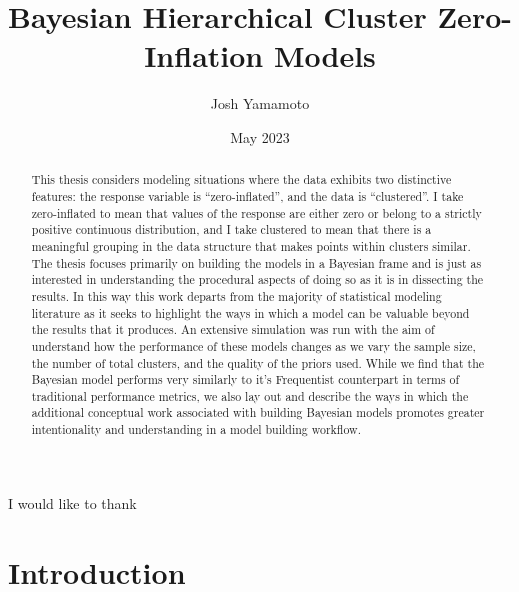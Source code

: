 \documentclass[12pt,twoside]{reedthesis}
\title{Bayesian Hierarchical Cluster Zero-Inflation Models}
\author{Josh Yamamoto}
\date{May 2023}
\begin{document}
  \maketitle

\frontmatter %
\pagestyle{empty} %
  \begin{acknowledgements}
    I would like to thank
  \end{acknowledgements}


  \hypersetup{linkcolor=black}
  \setcounter{secnumdepth}{2}
  \setcounter{tocdepth}{2}
  \tableofcontents

  \listoffigures
  \begin{abstract}
    This thesis considers modeling situations where the data exhibits two distinctive features: the response variable is ``zero-inflated'', and the data is ``clustered''. I take zero-inflated to mean that values of the response are either zero or belong to a strictly positive continuous distribution, and I take clustered to mean that there is a meaningful grouping in the data structure that makes points within clusters similar. The thesis focuses primarily on building the models in a Bayesian frame and is just as interested in understanding the procedural aspects of doing so as it is in dissecting the results. In this way this work departs from the majority of statistical modeling literature as it seeks to highlight the ways in which a model can be valuable beyond the results that it produces. An extensive simulation was run with the aim of understand how the performance of these models changes as we vary the sample size, the number of total clusters, and the quality of the priors used. While we find that the Bayesian model performs very similarly to it's Frequentist counterpart in terms of traditional performance metrics, we also lay out and describe the ways in which the additional conceptual work associated with building Bayesian models promotes greater intentionality and understanding in a model building workflow.
  \end{abstract}

\mainmatter %
\pagestyle{fancyplain} %

\hypertarget{intro-section}{%
\chapter{Introduction}\label{intro-section}}
\end{document}
